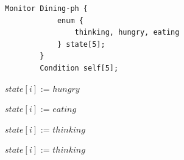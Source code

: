 \begin{itemize}
    \begin{lstlisting}[caption={Data structure (The dining philosophers problem (Monitor)).}, captionpos=b, mathescape=true]
        Monitor Dining-ph {
            enum {
                thinking, hungry, eating
            } state[5];
        } 
        Condition self[5];
    \end{lstlisting}
    \begin{algorithm}[H]
        \caption{$pickup(i)$.}
        \begin{algorithmic}[1]
                \State $state[i]$ := $hungry$
                \State {}
                    \State {}
                \EndIf
            \EndFunction
        \end{algorithmic}
    \end{algorithm}
    \begin{algorithm}[H]
        \caption{$test(i)$.}
        \begin{algorithmic}[1]
                    \State $state[i]$ := $eating$
                    \State {}
                \EndIf
            \EndFunction
        \end{algorithmic}
    \end{algorithm}
    \begin{algorithm}[H]
        \caption{$putdown(i)$.}
        \begin{algorithmic}[1]
                \State $state[i]$ := $thinking$
                \State {}
                \State {}
            \EndFunction
        \end{algorithmic}
    \end{algorithm}
    \begin{algorithm}[H]
        \caption{$initialization\_code()$.}
        \begin{algorithmic}[1]
             
                    \State $state[i]$ := $thinking$
                \EndFor
            \EndFunction
        \end{algorithmic}
    \end{algorithm}
    \begin{algorithm}[H]

\end{algorithm}
\end{itemize}

